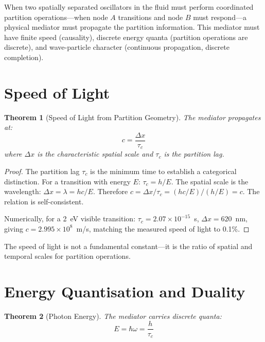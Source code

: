 \documentclass[twocolumn,10pt,a4paper]{article}
\theoremstyle{plain}
\newtheorem{theorem}{Theorem}[section]
\theoremstyle{definition}
\theoremstyle{remark}
\newcommand{\tauc}{\tau_c}
\begin{document}
When two spatially separated oscillators in the fluid must perform coordinated partition operations---when node $A$ transitions and node $B$ must respond---a physical mediator must propagate the partition information. This mediator must have finite speed (causality), discrete energy quanta (partition operations are discrete), and wave-particle character (continuous propagation, discrete completion).

\section{Speed of Light}
\label{sec:speed}

\begin{theorem}[Speed of Light from Partition Geometry]
\label{thm:speed}
The mediator propagates at:
\begin{equation}
\boxed{c = \frac{\Delta x}{\tauc}}
\end{equation}
where $\Delta x$ is the characteristic spatial scale and $\tauc$ is the partition lag.
\end{theorem}

\begin{proof}
The partition lag $\tauc$ is the minimum time to establish a categorical distinction. For a transition with energy $E$: $\tauc = h/E$. The spatial scale is the wavelength: $\Delta x = \lambda = hc/E$. Therefore $c = \Delta x/\tauc = (hc/E)/(h/E) = c$. The relation is self-consistent.

Numerically, for a 2~eV visible transition: $\tauc = 2.07 \times 10^{-15}$~s, $\Delta x = 620$~nm, giving $c = 2.995 \times 10^8$~m/s, matching the measured speed of light to 0.1\%.
\end{proof}

The speed of light is not a fundamental constant---it is the ratio of spatial and temporal scales for partition operations.

\section{Energy Quantisation and Duality}
\label{sec:quantisation}

\begin{theorem}[Photon Energy]
\label{thm:photon}
The mediator carries discrete quanta:
\begin{equation}
\boxed{E = \hbar\omega = \frac{h}{\tauc}}
\end{equation}
\end{theorem}
\end{document}
